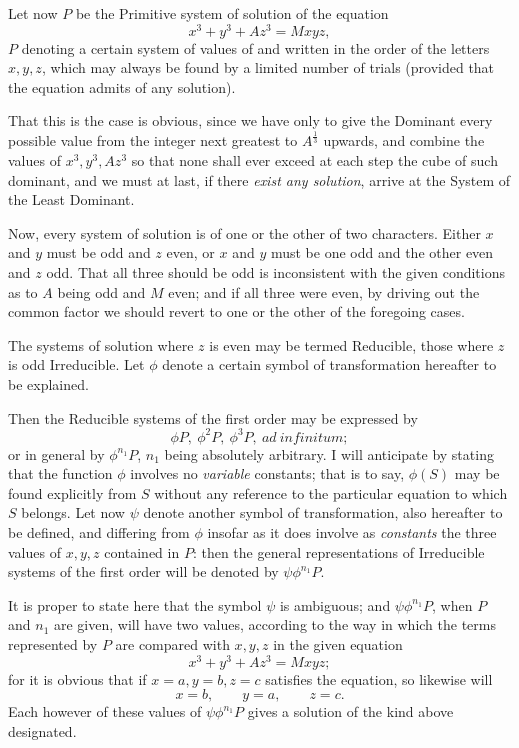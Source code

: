 \documentclass[11pt]{article}
\newcommand{\sourcepage}[1]{\marginpar{\scriptsize p.~#1}}
\begin{document}
{{Let now $P$ be the Primitive system of solution of the equation
\[
x^3+y^3+Az^3=Mxyz,
\]
$P$ denoting a certain system of values of and written in the order of the letters $x,y,z$, which may always be found by a limited number of trials (provided that the equation admits of any solution).

\sourcepage{115}
That this is the case is obvious, since we have only to give the Dominant every possible value from the integer next greatest to $A^{\frac{1}{3}}$ upwards, and combine the values of $x^3,y^3,Az^3$ so that none shall ever exceed at each step the cube of such dominant, and we must at last, if there \emph{exist any solution}, arrive at the System of the Least Dominant.

Now, every system of solution is of one or the other of two characters. Either $x$ and $y$ must be odd and $z$ even, or $x$ and $y$ must be one odd and the other even and $z$ odd. That all three should be odd is inconsistent with the given conditions as to $A$ being odd and $M$ even; and if all three were even, by driving out the common factor we should revert to one or the other of the foregoing cases.

The systems of solution where $z$ is even may be termed Reducible, those where $z$ is odd Irreducible. Let $\phi$ denote a certain symbol of transformation hereafter to be explained.

Then the Reducible systems of the first order may be expressed by
\[
\phi P,\ \phi^2P,\ \phi^3P,\ ad\ infinitum;
\]
or in general by $\phi^{n_1}P$, $n_1$ being absolutely arbitrary. I will anticipate by stating that the function $\phi$ involves no \emph{variable} constants; that is to say, $\phi(S)$ may be found explicitly from $S$ without any reference to the particular equation to which $S$ belongs. Let now $\psi$ denote another symbol of transformation, also hereafter to be defined, and differing from $\phi$ insofar as it does involve as \emph{constants} the three values of $x,y,z$ contained in $P$: then the general representations of Irreducible systems of the first order will be denoted by $\psi\phi^{n_1}P$.

It is proper to state here that the symbol $\psi$ is ambiguous; and $\psi\phi^{n_1}P$, when $P$ and $n_1$ are given, will have two values, according to the way in which the terms represented by $P$ are compared with $x,y,z$ in the given equation
\[
x^3+y^3+Az^3=Mxyz;
\]
for it is obvious that if $x=a,y=b,z=c$ satisfies the equation, so likewise will
\[
x=b,\qquad y=a,\qquad z=c.
\]
Each however of these values of $\psi\phi^{n_1}P$ gives a solution of the kind above designated.

}}
\end{document}
